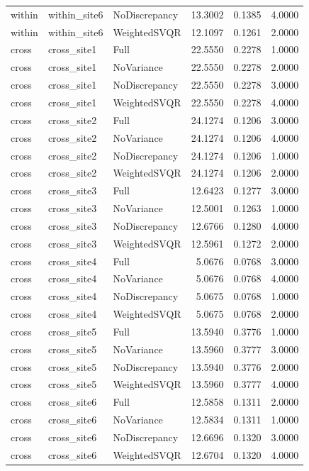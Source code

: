 \begin{table}
\begin{tabular}{lllrrr}
within & within\_site6 & NoDiscrepancy & 13.3002 & 0.1385 & 4.0000 \\
within & within\_site6 & WeightedSVQR & 12.1097 & 0.1261 & 2.0000 \\
cross & cross\_site1 & Full & 22.5550 & 0.2278 & 1.0000 \\
cross & cross\_site1 & NoVariance & 22.5550 & 0.2278 & 2.0000 \\
cross & cross\_site1 & NoDiscrepancy & 22.5550 & 0.2278 & 3.0000 \\
cross & cross\_site1 & WeightedSVQR & 22.5550 & 0.2278 & 4.0000 \\
cross & cross\_site2 & Full & 24.1274 & 0.1206 & 3.0000 \\
cross & cross\_site2 & NoVariance & 24.1274 & 0.1206 & 4.0000 \\
cross & cross\_site2 & NoDiscrepancy & 24.1274 & 0.1206 & 1.0000 \\
cross & cross\_site2 & WeightedSVQR & 24.1274 & 0.1206 & 2.0000 \\
cross & cross\_site3 & Full & 12.6423 & 0.1277 & 3.0000 \\
cross & cross\_site3 & NoVariance & 12.5001 & 0.1263 & 1.0000 \\
cross & cross\_site3 & NoDiscrepancy & 12.6766 & 0.1280 & 4.0000 \\
cross & cross\_site3 & WeightedSVQR & 12.5961 & 0.1272 & 2.0000 \\
cross & cross\_site4 & Full & 5.0676 & 0.0768 & 3.0000 \\
cross & cross\_site4 & NoVariance & 5.0676 & 0.0768 & 4.0000 \\
cross & cross\_site4 & NoDiscrepancy & 5.0675 & 0.0768 & 1.0000 \\
cross & cross\_site4 & WeightedSVQR & 5.0675 & 0.0768 & 2.0000 \\
cross & cross\_site5 & Full & 13.5940 & 0.3776 & 1.0000 \\
cross & cross\_site5 & NoVariance & 13.5960 & 0.3777 & 3.0000 \\
cross & cross\_site5 & NoDiscrepancy & 13.5940 & 0.3776 & 2.0000 \\
cross & cross\_site5 & WeightedSVQR & 13.5960 & 0.3777 & 4.0000 \\
cross & cross\_site6 & Full & 12.5858 & 0.1311 & 2.0000 \\
cross & cross\_site6 & NoVariance & 12.5834 & 0.1311 & 1.0000 \\
cross & cross\_site6 & NoDiscrepancy & 12.6696 & 0.1320 & 3.0000 \\
cross & cross\_site6 & WeightedSVQR & 12.6704 & 0.1320 & 4.0000 \\
\bottomrule
\end{tabular}
\end{table}
